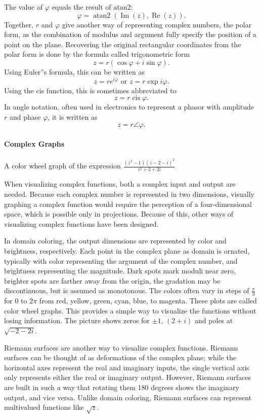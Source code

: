 The value of $\varphi$ equals the result of $\text{atan2}$:
$$
\varphi = \operatorname{atan2} \left(\operatorname{Im}(z), \operatorname{Re}(z)\right).
$$
Together, $r$ and $\varphi$ give another way of representing complex numbers, the polar form, as the combination of modulus and argument fully specify the position of a point on the plane. Recovering the original rectangular coordinates from the polar form is done by the formula called trigonometric form
$$
z = r(\cos \varphi + i\sin \varphi).
$$
Using Euler''s formula, this can be written as
$$
z = re^{i\varphi} \text{ or } z = r\exp i\varphi.
$$
Using the cis function, this is sometimes abbreviated to
$$
z = r \operatorname{cis} \varphi.
$$
In angle notation, often used in electronics to represent a phasor with amplitude $r$ and phase $\varphi$, it is written as
$$
z = r \angle \varphi.
$$
\paragraph{Complex Graphs}

A color wheel graph of the expression $\frac{(z^2 - 1)(z - 2 - i)^2}{z^2 + 2 + 2i}$

When visualizing complex functions, both a complex input and output are needed. Because each complex number is represented in two dimensions, visually graphing a complex function would require the perception of a four-dimensional space, which is possible only in projections. Because of this, other ways of visualizing complex functions have been designed.

In domain coloring, the output dimensions are represented by color and brightness, respectively. Each point in the complex plane as domain is ornated, typically with color representing the argument of the complex number, and brightness representing the magnitude. Dark spots mark moduli near zero, brighter spots are farther away from the origin, the gradation may be discontinuous, but is assumed as monotonous. The colors often vary in steps of $\frac{\pi}{3}$ for $0$ to $2\pi$ from red, yellow, green, cyan, blue, to magenta. These plots are called color wheel graphs. This provides a simple way to visualize the functions without losing information. The picture shows zeros for $\pm1$, $(2 + i)$ and poles at $\sqrt{-2 - 2i}$.

Riemann surfaces are another way to visualize complex functions. Riemann surfaces can be thought of as deformations of the complex plane; while the horizontal axes represent the real and imaginary inputs, the single vertical axis only represents either the real or imaginary output. However, Riemann surfaces are built in such a way that rotating them 180 degrees shows the imaginary output, and vice versa. Unlike domain coloring, Riemann surfaces can represent multivalued functions like $\sqrt{z}$.

